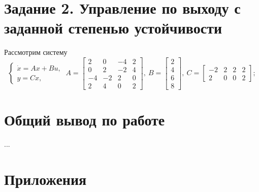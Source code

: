 \documentclass[a4paper, 12pt]{article}
\begin{document}
    \section{Задание 2. Управление по выходу с заданной степенью устойчивости}
    Рассмотрим систему
    $$
    \begin{cases}
        \dot{x}=Ax+Bu,\\
        y=Cx,
    \end{cases}\ A=\begin{bmatrix}
        2 &0 &-4 &2\\
        0 &2 &-2 &4\\
        -4 &-2 &2 &0\\
        2 &4 &0 &2
    \end{bmatrix},\ B=\begin{bmatrix}
        2\\4\\6\\8
    \end{bmatrix},\ C=\begin{bmatrix}
        -2 &2 &2 &2\\
        2 &0 &0 &2
    \end{bmatrix};
    $$


    \section{Общий вывод по работе}
    ...


    \section{Приложения}
\end{document}
